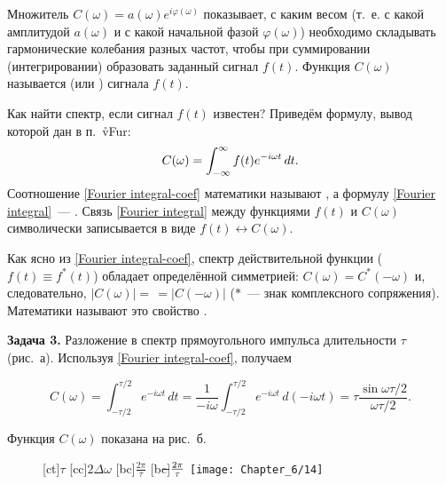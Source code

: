 Множитель $C(\omega)=a(\omega)e^{i\varphi(\omega)}$ показывает, с каким весом (т.~е. с какой амплитудой $a(\omega)$ и с
какой начальной фазой $\varphi(\omega)$) необходимо складывать гармонические колебания разных частот, чтобы при суммировании
(интегрировании) образовать заданный сигнал $f(t)$. Функция $C(\omega)$ называется  (или
) сигнала $f(t)$.

Как найти спектр, если сигнал $f(t)$ известен? Приведём формулу, вывод которой дан в п.~\r{vFur}:
\begin{equation}
	\eqmark{Fourier integral-coef}
	C(\omega)=\int_{-\infty}^\infty f(t)e^{-i\omega t}\,dt.
\end{equation}
Соотношение \eqref{Fourier integral-coef} математики называют , а формулу \eqref{Fourier integral}~--- . Связь \eqref{Fourier integral} между функциями $f(t)$ и $C(\omega)$ символически записывается в виде
$f(t)\leftrightarrow C(\omega)$.

Как ясно из \eqref{Fourier integral-coef}, спектр действительной функции ($f(t)\equiv f^*(t)$) обладает определённой симметрией:
$C(\omega)=C^*(-\omega)$ и, следовательно, $|C(\omega)|=\,=|C(-\omega)|$ ($*$~--- знак комплексного сопряжения). Математики называют это
свойство .

\textbf{Задача 3.} Разложение в спектр прямоугольного импульса длительности $\tau$ (рис.~а). Используя \eqref{Fourier integral-coef}, получаем

\begin{equation*}
	C(\omega)=\int_{-\tau/2}^{\tau/2} e^{-i\omega t}\,dt=\frac{1}{-i\omega}\int_{-\tau/2}^{\tau/2} e^{-i\omega t}\,
d(-i\omega t)=\tau\frac{\sin\omega\tau/2}{\omega\tau/2}.
\end{equation*}

Функция $C(\omega)$ показана на рис.~б.
\begin{figure}[h!]
	[ct]{$\tau$}
	[cc]{$2\Delta\omega$}
	[bc]{$\frac{2\pi}{\tau}$}
	[bc]{$\llap{$-$}\frac{2\pi}{\tau}$}
	\texttt{[image: Chapter\_6/14]}
	\caption{}
\end{figure}

